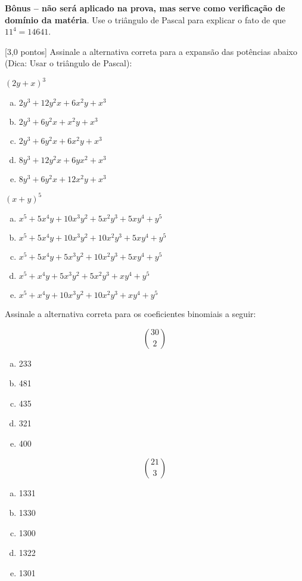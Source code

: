 \exercise{} {\bf Bônus -- não será aplicado na prova, mas serve como
  verificação de domínio da matéria}. Use o triângulo de Pascal para
explicar o fato de que $11^4 = 14641$.


\exercise{} [3,0 pontos] Assinale a alternativa correta para a
expansão das potências abaixo (Dica: Usar o triângulo de
Pascal):

 \hfil$\left(2y + x\right)^3$\hfill

 \begin{enumerate}[(a)]
 \item $2y^3 + 12y^2x + 6x^2y + x^3$
 \item $2y^3 + 6y^2x + x^2y + x^3$
 \item $2y^3 + 6y^2x + 6x^2y + x^3$ \correta
 \item $8y^3 + 12y^2x + 6yx^2 + x^3$
 \item $8y^3 + 6y^2x + 12x^2y + x^3$
 \end{enumerate}

 \hfil$\left(x + y\right)^5$\hfill

 \begin{enumerate}[(a)]
 \item $x^5 + 5x^4y + 10x^3y^2 + 5x^2y^3 + 5xy^4 + y^5$
 \item $x^5 + 5x^4y + 10x^3y^2 + 10x^2y^3 + 5xy^4 + y^5$ \correta
 \item $x^5 + 5x^4y + 5x^3y^2 + 10x^2y^3 + 5xy^4 + y^5$
 \item $x^5 + x^4y + 5x^3y^2 + 5x^2y^3 + xy^4 + y^5$
 \item $x^5 + x^4y + 10x^3y^2 + 10x^2y^3 + xy^4 + y^5$
 \end{enumerate}

 \exercise{}  Assinale a alternativa correta para os
 coeficientes binomiais a seguir:

$$ {30 \choose 2}$$
\begin{enumerate}[(a)]
\item 233
\item 481
\item 435 \correta
\item 321
\item 400
\end{enumerate}

\newpage
$${21 \choose 3}$$

\begin{enumerate}[(a)]
\item 1331
\item 1330 \correta
\item 1300
\item 1322
\item 1301
\end{enumerate}

